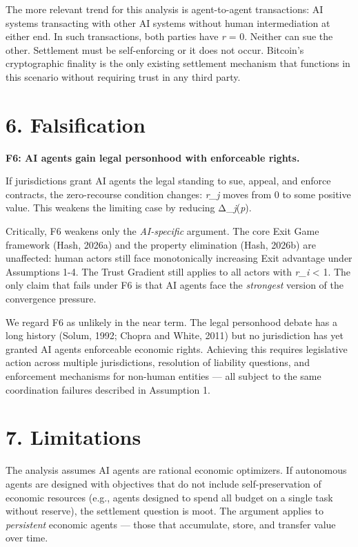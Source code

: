 \documentclass[12pt]{article}
\theoremstyle{definition}
\theoremstyle{remark}
\begin{document}
The more relevant trend for this analysis is agent-to-agent
transactions: AI systems transacting with other AI systems without human
intermediation at either end. In such transactions, both parties have
\emph{r} = 0. Neither can sue the other. Settlement must be
self-enforcing or it does not occur. Bitcoin's cryptographic finality is
the only existing settlement mechanism that functions in this scenario
without requiring trust in any third party.
\section{6. Falsification}\label{falsification}

\textbf{F6: AI agents gain legal personhood with enforceable rights.}

If jurisdictions grant AI agents the legal standing to sue, appeal, and
enforce contracts, the zero-recourse condition changes: \emph{r\_j}
moves from 0 to some positive value. This weakens the limiting case by
reducing Δ\_\emph{j}(\emph{p}).

Critically, F6 weakens only the \emph{AI-specific} argument. The core
Exit Game framework (Hash, 2026a) and the property elimination (Hash,
2026b) are unaffected: human actors still face monotonically increasing
Exit advantage under Assumptions 1-4. The Trust Gradient still applies
to all actors with \emph{r\_i} \textless{} 1. The only claim that fails
under F6 is that AI agents face the \emph{strongest} version of the
convergence pressure.

We regard F6 as unlikely in the near term. The legal personhood debate
has a long history (Solum, 1992; Chopra and White, 2011) but no
jurisdiction has yet granted AI agents enforceable economic rights.
Achieving this requires legislative action across multiple
jurisdictions, resolution of liability questions, and enforcement
mechanisms for non-human entities --- all subject to the same
coordination failures described in Assumption 1.
\section{7. Limitations}\label{limitations}

The analysis assumes AI agents are rational economic optimizers. If
autonomous agents are designed with objectives that do not include
self-preservation of economic resources (e.g., agents designed to spend
all budget on a single task without reserve), the settlement question is
moot. The argument applies to \emph{persistent} economic agents ---
those that accumulate, store, and transfer value over time.
\end{document}
